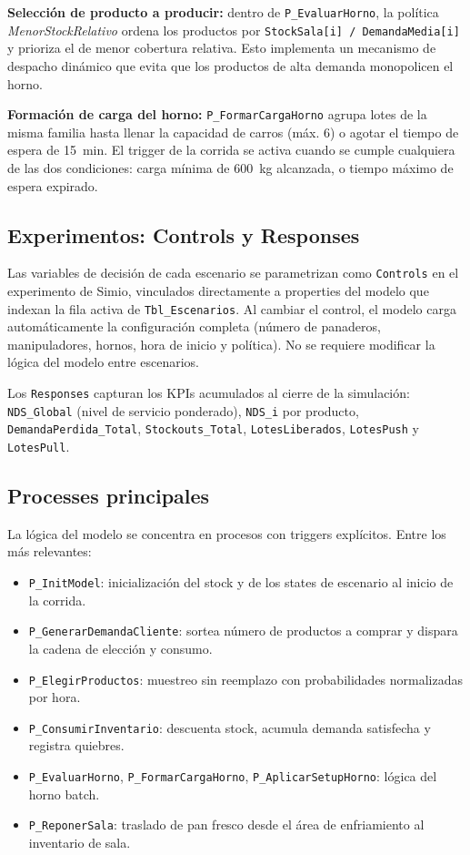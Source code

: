 \documentclass[12pt]{article}
\begin{document}
\textbf{Selección de producto a producir:} dentro de \texttt{P\_EvaluarHorno}, la política \textit{MenorStockRelativo} ordena los productos por \texttt{StockSala[i] / DemandaMedia[i]} y prioriza el de menor cobertura relativa. Esto implementa un mecanismo de despacho dinámico que evita que los productos de alta demanda monopolicen el horno.

\textbf{Formación de carga del horno:} \texttt{P\_FormarCargaHorno} agrupa lotes de la misma familia hasta llenar la capacidad de carros (máx. 6) o agotar el tiempo de espera de 15~min. El trigger de la corrida se activa cuando se cumple cualquiera de las dos condiciones: carga mínima de 600~kg alcanzada, o tiempo máximo de espera expirado.

\subsection{Experimentos: Controls y Responses}

Las variables de decisión de cada escenario se parametrizan como \texttt{Controls} en el experimento de Simio, vinculados directamente a properties del modelo que indexan la fila activa de \texttt{Tbl\_Escenarios}. Al cambiar el control, el modelo carga automáticamente la configuración completa (número de panaderos, manipuladores, hornos, hora de inicio y política). No se requiere modificar la lógica del modelo entre escenarios.

Los \texttt{Responses} capturan los KPIs acumulados al cierre de la simulación: \texttt{NDS\_Global} (nivel de servicio ponderado), \texttt{NDS\_i} por producto, \texttt{DemandaPerdida\_Total}, \texttt{Stockouts\_Total}, \texttt{LotesLiberados}, \texttt{LotesPush} y \texttt{LotesPull}.

\subsection{Processes principales}

La lógica del modelo se concentra en procesos con triggers explícitos. Entre los más relevantes:

\begin{itemize}
  \item \texttt{P\_InitModel}: inicialización del stock y de los states de escenario al inicio de la corrida.
  \item \texttt{P\_GenerarDemandaCliente}: sortea número de productos a comprar y dispara la cadena de elección y consumo.
  \item \texttt{P\_ElegirProductos}: muestreo sin reemplazo con probabilidades normalizadas por hora.
  \item \texttt{P\_ConsumirInventario}: descuenta stock, acumula demanda satisfecha y registra quiebres.
  \item \texttt{P\_EvaluarHorno}, \texttt{P\_FormarCargaHorno}, \texttt{P\_AplicarSetupHorno}: lógica del horno batch.
  \item \texttt{P\_ReponerSala}: traslado de pan fresco desde el área de enfriamiento al inventario de sala.
\end{itemize}
\end{document}
